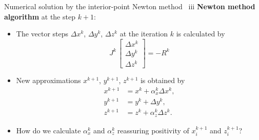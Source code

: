 \begin{frame}{Numerical solution by the interior-point Newton method \, iii}
%
\vskip 10pt
\alert{\bf Newton method algorithm} at the step $k+1$: 
%	
\begin{itemize}
\item The vector steps $\Delta x^{k}$, $\Delta y^{k}$,
$\Delta z^{k}$ at the iteration $k$ is calculated by 
%
\[
J^k \, 
\begin{bmatrix}
	\Delta x^{k}\\
	\Delta y^{k}\\
	\Delta z^{k}
\end{bmatrix}
=- R^k
\]
%
\item New approximations $x^{k+1}$, $y^{k+1}$,
$z^{k+1}$ is obtained by
\begin{align*}
x^{k+1} & =x^{k}+\alpha_{x}^{k}\Delta x^{k},\\
y^{k+1} & =y^{k}+\Delta y^{k},\\
z^{k+1} & =z^{k}+\alpha_{z}^{k}\Delta z^{k}.
\end{align*}
\item How do we calculate $\alpha_{x}^{k}$ and $\alpha_{z}^{k}$ 
reassuring positivity of $x_{i}^{k+1}$ and $z_{i}^{k+1}$?
\end{itemize}
\end{frame}
%
%
